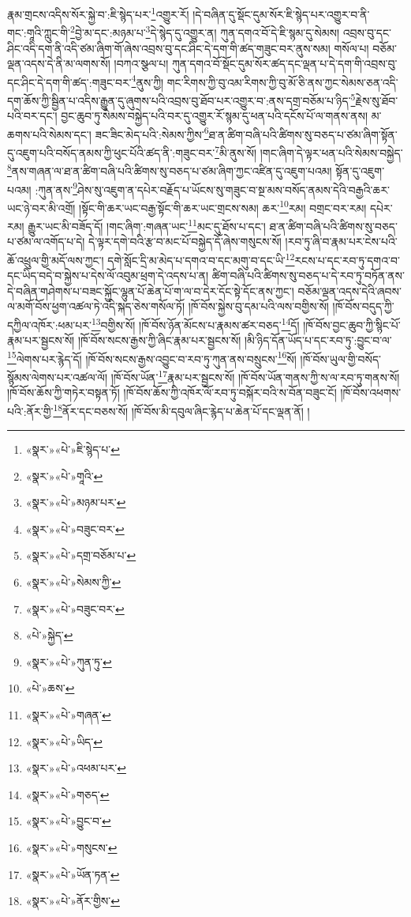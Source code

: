 རྣམ་གྲངས་འདིས་སོར་སྐྱེ་བ་:ཇི་སྙེད་པར་\footnote{«སྣར་»«པེ་»ཇི་སྙེད་པ་}འགྱུར་རོ། །དེ་བཞིན་དུ་སྡོང་དུམ་སོར་ཇི་སྙེད་པར་འགྱུར་བ་ནི་གང་:གཱའི་ཀླུང་གི་\footnote{«སྣར་»«པེ་»གཱའི་}བྱེ་མ་དང་:མཉམ་པ་\footnote{«སྣར་»«པེ་»མཉམ་པར་}དེ་སྙེད་དུ་འགྱུར་ན། ཀུན་དགའ་བོ་དེ་ཇི་སྙམ་དུ་སེམས། འབྲས་བུ་དང་ཤིང་འདི་དག་ནི་འདི་ཙམ་ཞིག་གོ་ཞེས་འབྲས་བུ་དང་ཤིང་དེ་དག་གི་ཚད་གཟུང་བར་ནུས་སམ། གསོལ་པ། བཅོམ་ལྡན་འདས་དེ་ནི་མ་ལགས་སོ། །བཀའ་སྩལ་པ། ཀུན་དགའ་བོ་སྡོང་དུམ་སོར་ཚད་དང་ལྡན་པ་དེ་དག་གི་འབྲས་བུ་དང་ཤིང་དེ་དག་གི་ཚད་:གཟུང་བར་\footnote{«སྣར་»«པེ་»བཟུང་བར་}ནུས་ཀྱི། གང་རིགས་ཀྱི་བུ་འམ་རིགས་ཀྱི་བུ་མོ་ཅི་ནས་ཀྱང་སེམས་ཅན་འདི་དག་ཆོས་ཀྱི་སྦྱིན་པ་འདིས་རྒྱུན་དུ་ཞུགས་པའི་འབྲས་བུ་ཐོབ་པར་འགྱུར་བ་:ནས་དགྲ་བཅོམ་པ་ཉིད་\footnote{«སྣར་»«པེ་»དགྲ་བཅོམ་པ་}རྗེས་སུ་ཐོབ་པའི་བར་དང་། བྱང་ཆུབ་ཏུ་སེམས་བསྐྱེད་པའི་བར་དུ་འགྱུར་རོ་སྙམ་དུ་ཕན་པའི་དངོས་པོ་ལ་གནས་ནས། མ་ཆགས་པའི་སེམས་དང་། ཟང་ཟིང་མེད་པའི་:སེམས་ཀྱིས་\footnote{«སྣར་»«པེ་»སེམས་ཀྱི་}ཐ་ན་ཚིག་བཞི་པའི་ཚིགས་སུ་བཅད་པ་ཙམ་ཞིག་སྟོན་དུ་འཇུག་པའི་བསོད་ནམས་ཀྱི་ཕུང་པོའི་ཚད་ནི་:གཟུང་བར་\footnote{«སྣར་»«པེ་»བཟུང་བར་}མི་ནུས་སོ། །གང་ཞིག་དེ་ལྟར་ཕན་པའི་སེམས་བསྐྱེད་\footnote{«པེ་»སྐྱེད་}ནས་གཞན་ལ་ཐ་ན་ཚིག་བཞི་པའི་ཚིགས་སུ་བཅད་པ་ཙམ་ཞིག་ཀྱང་འཛིན་དུ་འཇུག་པའམ། སྟོན་དུ་འཇུག་པའམ། :ཀུན་ནས་\footnote{«སྣར་»«པེ་»ཀུན་ཏུ་}ཤེས་སུ་འཇུག་ན་དཔེར་བརྗོད་པ་ཡོངས་སུ་གཟུང་བ་སྔ་མས་བསོད་ནམས་དེའི་བརྒྱའི་ཆར་ཡང་ཉེ་བར་མི་འགྲོ། །སྟོང་གི་ཆར་ཡང་བརྒྱ་སྟོང་གི་ཆར་ཡང་གྲངས་སམ། ཆར་\footnote{«པེ་»ཆས་}རམ། བགྲང་བར་རམ། དཔེར་རམ། རྒྱུར་ཡང་མི་བཟོད་དོ། །གང་ཞིག་:གཞན་ཡང་\footnote{«སྣར་»«པེ་»གཞན་}མང་དུ་ཐོས་པ་དང་། ཐ་ན་ཚིག་བཞི་པའི་ཚིགས་སུ་བཅད་པ་ཙམ་ལ་འགོད་པ་དེ། དེ་ལྟར་དགེ་བའི་རྩ་བ་མང་པོ་བསྐྱེད་དོ་ཞེས་གསུངས་སོ། །རབ་ཏུ་ཞི་བ་རྣམ་པར་ངེས་པའི་ཆོ་འཕྲུལ་གྱི་མདོ་ལས་ཀྱང་། དགེ་སློང་དྲི་མ་མེད་པ་དགའ་བ་དང་མགུ་བ་དང་ཡི་\footnote{«སྣར་»«པེ་»ཡིད་}རངས་པ་དང་རབ་ཏུ་དགའ་བ་དང་ཡིད་བདེ་བ་སྐྱེས་པ་དེས་ལོ་འབུམ་ཕྲག་དེ་འདས་པ་ན། ཚིག་བཞི་པའི་ཚིགས་སུ་བཅད་པ་དེ་རབ་ཏུ་བཏོན་ནས་དེ་བཞིན་གཤེགས་པ་བཟང་སྐྱོང་ལྷུན་པོ་ཆེན་པོ་ག་ལ་བ་དེར་དོང་སྟེ་དོང་ནས་ཀྱང་། བཅོམ་ལྡན་འདས་དེའི་ཞབས་ལ་མགོ་བོས་ཕྱག་འཚལ་ཏེ་འདི་སྐད་ཅེས་གསོལ་ཏོ། །ཁོ་བོས་སྐྱེས་བུ་དམ་པའི་ལས་བགྱིས་སོ། །ཁོ་བོས་བདུད་ཀྱི་དཀྱིལ་འཁོར་:ཕམ་པར་\footnote{«སྣར་»«པེ་»འཕམ་པར་}བགྱིས་སོ། །ཁོ་བོས་ཉོན་མོངས་པ་རྣམས་ཚར་བཅད་\footnote{«སྣར་»«པེ་»གཅད་}དོ། །ཁོ་བོས་བྱང་ཆུབ་ཀྱི་སྙིང་པོ་རྣམ་པར་སྦྱངས་སོ། །ཁོ་བོས་སངས་རྒྱས་ཀྱི་ཞིང་རྣམ་པར་སྦྱངས་སོ། །མི་ཉིད་དོན་ཡོད་པ་དང་རབ་ཏུ་:བྱུང་བ་ལ་\footnote{«སྣར་»«པེ་»བྱུང་བ་}ལེགས་པར་རྙེད་དོ། །ཁོ་བོས་སངས་རྒྱས་འབྱུང་བ་རབ་ཏུ་ཀུན་ནས་བསྲུངས་\footnote{«སྣར་»«པེ་»གསུངས་}སོ། །ཁོ་བོས་ཡུལ་གྱི་བསོད་སྙོམས་ལེགས་པར་འཚལ་ལོ། །ཁོ་བོས་ཡོན་\footnote{«སྣར་»«པེ་»ཡོན་ཏན་}རྣམ་པར་སྦྱངས་སོ། །ཁོ་བོས་ཡོན་གནས་ཀྱི་ས་ལ་རབ་ཏུ་གནས་སོ། །ཁོ་བོས་ཆོས་ཀྱི་གཏེར་བསྟན་ཏོ། །ཁོ་བོས་ཆོས་ཀྱི་འཁོར་ལོ་རབ་ཏུ་བསྐོར་བའི་ས་བོན་བཟུང་ངོ། །ཁོ་བོས་འཕགས་པའི་:ནོར་གྱི་\footnote{«སྣར་»«པེ་»ནོར་གྱིས་}ནོར་དང་བཅས་སོ། །ཁོ་བོས་མི་དབུལ་ཞིང་རྙེད་པ་ཆེན་པོ་དང་ལྡན་ནོ། །
